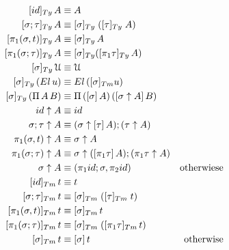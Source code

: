 \documentclass[a4paper,UKenglish,numberwithinsect,cleveref,thm-restate]{lipics-v2021}
\begin{document}
\begin{alignat*}{5}
[ \idS ]_{\Ty}\,A             & \jdeq A \\
[ \sigma ; \tau ]_{\Ty}\,A    & \jdeq [ \sigma ]_{\Ty}\;([ \tau ]_{\Ty}\;A) \\
[ \pi_1(\sigma, t) ]_{\Ty}\,A & \jdeq [\sigma]_\Ty\,A \\
[ \pi_1(\sigma; \tau) ]_{\Ty}\,A & \jdeq [\sigma]_\Ty ([\pi_1\tau]_\Ty \,A) \\
[ \sigma ]_{\Ty}\,\UU           & \jdeq \UU \\
[ \sigma ]_{\Ty}\,(\El\, u) & \jdeq \El\,([\sigma]_{\Tm}{u}) \\
[ \sigma ]_{\Ty}\,(\Pi\,A\,B) & \jdeq \Pi\,(\sub{\sigma}{A})\,(\sub{\sigma\uparrow A}{B}) \\
\idS                \uparrow A & \jdeq \idS \\
\sigma ; \tau       \uparrow A & \jdeq (\sigma \uparrow \sub{\tau}{A} ) ; (\tau \uparrow A) \\
\pi_1(\sigma, t)    \uparrow A & \jdeq \sigma \uparrow A \\
\pi_1(\sigma; \tau) \uparrow A & \jdeq \sigma \uparrow (\sub{\pi_1 \tau}{A}) ; (\pi_1 \tau \uparrow A) \\
\sigma              \uparrow A & \jdeq (\pi_1 \idS ; \sigma , \pi_2 \idS) & \text{otherwiese} \\
 [ \idS ]_{\Tm}\,t                & \jdeq t \\
 [ \sigma ; \tau ]_{\Tm}\,t       & \jdeq [ \sigma ]_{\Tm}\;([ \tau ]_{\Tm}\;t) \\
 [ \pi_1(\sigma, t) ]_{\Tm}\,t    & \jdeq [\sigma]_\Tm\,t \\
 [ \pi_1(\sigma; \tau) ]_{\Tm}\,t & \jdeq [\sigma]_\Tm\; ([\pi_1\tau]_\Tm \,t) \\
 [ \sigma ]_{\Tm}\,t              & \jdeq [ \sigma ]\,t & \text{otherwise}
\end{alignat*}
\end{document}
